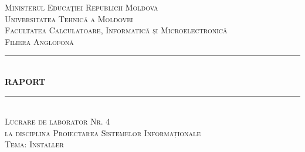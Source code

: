 \documentclass{standalone}
\begin{document}
	
\begin{titlepage}

\newcommand{\HRule}{\rule{\linewidth}{0.5mm}} %

\center %
\textsc{\Large Ministerul Educaţiei Republicii Moldova}\\[0.2cm] %
\textsc{\Large Universitatea Tehnică a Moldovei}\\[0.2cm] %
\textsc{\Large Facultatea Calculatoare, Informatică și Microelectronică}\\[0.2cm] %
\textsc{\Large Filiera Anglofonă}\\[1.5cm] 

\HRule \\[0.4cm]
{ \huge \bfseries RAPORT}\\[0.4cm] %
\HRule \\[1.5cm]

\textsc{\LARGE Lucrare de laborator Nr. 4}\\[0.5cm] %
\textsc{\Large la disciplina Proiectarea Sistemelor Informaționale}\\[0.5cm] %
\textsc{\Large Tema: Installer}\\[5.0cm] %

 


\end{titlepage}
\end{document}

